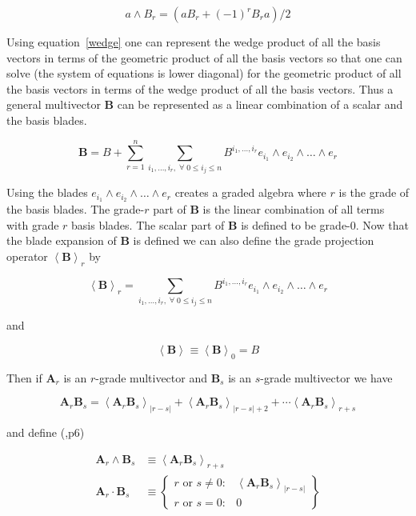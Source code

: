 \documentclass[10pt]{article}
\newcommand{\llt}{\left <}
\newcommand{\rgt}{\right >}
\newcommand{\abs}[1]{\left |{#1}\right |}
\newcommand{\W}{\wedge}
\newcommand{\proj}[2]{\llt {#1} \rgt_{#2}}
\newcommand{\braces}[1]{\left \{ {#1} \right \}}
\begin{document}
   \begin{equation}\label{wedge}
      a\W B_{r} = (aB_{r}+(-1)^{r}B_{r}a)/2
   \end{equation}

Using equation~\ref{wedge} one can represent the wedge product of all the basis vectors
in terms of the geometric product of all the basis vectors so that one can solve (the system
of equations is lower diagonal) for the geometric product of all the basis vectors in terms of
the wedge product of all the basis vectors.  Thus a general multivector $\bm{B}$ can be
represented as a linear combination of a scalar and the basis blades.

   \begin{equation}
      \bm{B} = B + \sum_{r=1}^{n}\sum_{i_{1},\dots,i_{r},\;\forall\; 0\le i_{j} \le n} B^{i_{1},\dots,i_{r}}e_{i_{1}}\W e_{i_{2}}\W\dots\W e_{r}
   \end{equation}

Using the blades $e_{i_{1}}\W e_{i_{2}}\W\dots\W e_{r}$ creates a graded
algebra where $r$ is the grade of the basis blades.  The grade-$r$
part of $\bm{B}$ is the linear combination of all terms with
grade $r$ basis blades. The scalar part of $\bm{B}$ is defined to
be grade-$0$.  Now that the blade expansion of $\bm{B}$ is defined
we can also define the grade projection operator $\proj{\bm{B}}{r}$ by

   \begin{equation}
      \proj{\bm{B}}{r} = \sum_{i_{1},\dots,i_{r},\;\forall\; 0\le i_{j} \le n} B^{i_{1},\dots,i_{r}}e_{i_{1}}\W e_{i_{2}}\W\dots\W e_{r}
   \end{equation}

and

   \begin{equation}
      \proj{\bm{B}}{} \equiv \proj{\bm{B}}{0} = B
   \end{equation}

Then if $\bm{A}_{r}$ is an $r$-grade multivector and $\bm{B}_{s}$ is an $s$-grade multivector we have

   \begin{equation}
      \bm{A}_{r}\bm{B}_{s} = \proj{\bm{A}_{r}\bm{B}_{s}}{\abs{r-s}}+\proj{\bm{A}_{r}\bm{B}_{s}}{\abs{r-s}+2}+\cdots
                             \proj{\bm{A}_{r}\bm{B}_{s}}{r+s}
   \end{equation}

and define (\cite{Hestenes},p6)

   \begin{align}
      \bm{A}_{r}\W\bm{B}_{s} &\equiv \proj{\bm{A}_{r}\bm{B}_{s}}{r+s} \\
      \bm{A}_{r}\cdot\bm{B}_{s} &\equiv \braces{ \begin{array}{cc}
      r\mbox{ or }s \ne 0: & \proj{\bm{A}_{r}\bm{B}_{s}}{\abs{r-s}}  \\
      r\mbox{ or }s = 0: & 0 \end{array}}
   \end{align}
\end{document}
